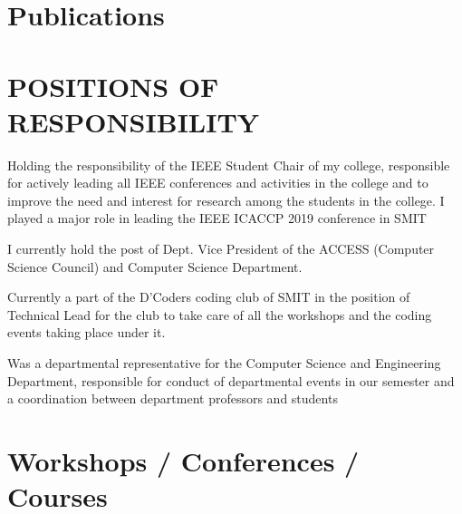 \documentclass[]{imman_resume}
\begin{document}
\begin{minipage}[t]{1\textwidth}

\section{Publications} 
\sectionsep
\sectionsep

\renewcommand\refname{\vskip -1.5cm} %


\nocite{*}

\section{POSITIONS OF RESPONSIBILITY}


Holding the responsibility of the IEEE Student Chair of my college, responsible for actively leading all IEEE conferences and
activities in the college and to improve the need and interest for research among the students in the college. I played a major role in leading the IEEE ICACCP 2019 conference in SMIT
\sectionsep


I currently hold the post of Dept. Vice President of the ACCESS (Computer Science Council) and Computer Science
Department.
\sectionsep


Currently a part of the D’Coders coding club of SMIT in the position of Technical Lead for the club to take care of all the
workshops and the coding events taking place under it.
\sectionsep


Was a departmental representative for the Computer Science and Engineering Department, responsible for conduct of departmental events in our semester and a coordination between department professors and students
\sectionsep

\section{Workshops / Conferences / Courses}


\end{minipage}
\end{document}

